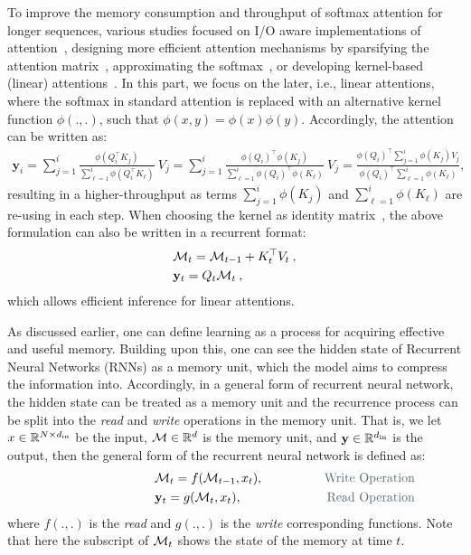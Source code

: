 To improve the memory consumption and throughput of softmax attention for longer sequences, various studies focused on I/O aware implementations of attention~\citep{flashattention-1, dao2024flashattention}, designing more efficient attention mechanisms by sparsifying the attention matrix~\citep{choromanski2021rethinking, dai2019transformerxl, chen2021scatterbrain}, approximating the softmax~\citep{arora2024simple}, or developing kernel-based (linear) attentions~\citep{kacham2024polysketchformer, schlag2021linear, yang2024gatedattn, aksenov2024linear}. In this part, we focus on the later, i.e., linear attentions, where the softmax in standard attention is replaced with an alternative kernel function $\phi(., .)$, such that $ \phi(x, y) = \phi(x)\phi(y)$. Accordingly, the attention can be written as:
\begin{align}
    \mathbf{y}_i = \sum_{j = 1}^{i} \frac{\phi(Q_i^\top K_j)}{\sum_{\ell = 1}^{i} \phi(Q_i^{\top} K_{\ell})} \: V_j = \sum_{j = 1}^{i} \frac{\phi(Q_i)^\top \phi(K_j)}{\sum_{\ell = 1}^{i} \phi(Q_i)^{\top} \phi(K_{\ell})} \: V_j = \frac{\phi(Q_i)^{\top} \sum_{j=1}^{i} \phi(K_j) V_j}{\phi(Q_i)^{\top} \sum_{\ell = 1}^{i} \phi(K_{\ell})}, 
\end{align}
resulting in a higher-throughput as terms $\sum_{j=1}^{i} \phi(K_j)$ and $\sum_{\ell = 1}^{i} \phi(K_{\ell})$ are re-using in each step. When choosing the kernel as identity matrix~\citep{sun2023retentive}, the above formulation can also be written in a recurrent format:
\begin{align}\label{eq:linear-transformer}
    & \M_{t} = \M_{t-1} + K_t^\top V_t\:,\\
    &\mathbf{y}_t = Q_t \M_t\:,
\end{align}
which allows efficient inference for linear attentions.


As discussed earlier, one can define learning as a process for acquiring effective and useful memory. Building upon this, one can see the hidden state of Recurrent Neural Networks (RNNs) as a memory unit, which the model aims to compress the information into. Accordingly, in a general form of recurrent neural network, the hidden state can be treated as a memory unit and the recurrence process can be split into the \textcolor{c1}{\emph{read}} and \textcolor{c1}{\emph{write}} operations in the memory unit. That is, we let $x \in \mathbb{R}^{N \times d_{\text{in}}}$ be the input, $\mathcal{M} \in \mathbb{R}^{d}$ is the memory unit, and $\mathbf{y} \in \mathbb{R}^{d_{\text{in}}}$ is the output, then the general form of the recurrent neural network is defined as:
\begin{align}
    &\qquad \qquad \qquad \qquad \M_t = f(\M_{t-1}, x_t) , \qquad \qquad & \textcolor{c1}{\text{Write Operation}}\\
    &\qquad \qquad \qquad \qquad \mb{y}_{t} = g(\M_t, x_t), \qquad \qquad &\textcolor{c1}{\text{Read Operation}}
\end{align}
where $f(.,.)$ is the \textcolor{c1}{\emph{read}} and $g(.,.)$ is the \textcolor{c1}{\emph{write}} corresponding functions. Note that here the subscript of $\mathcal{M}_t$ shows the state of the memory at time $t$. 


